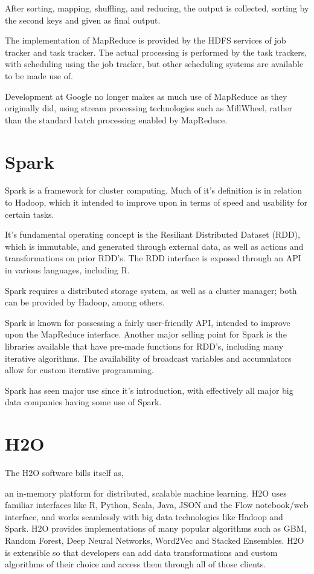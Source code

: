 \documentclass[10pt,a4paper]{article}
\begin{document}
After sorting, mapping, shuffling, and reducing, the output is
collected, sorting by the second keys and given as final output.

The implementation of MapReduce is provided by the HDFS services of
job tracker and task tracker. The actual processing is performed by
the task trackers, with scheduling using the job tracker, but other
scheduling systems are available to be made use of.

Development at Google no longer makes as much use of MapReduce as they
originally did, using stream processing technologies such as
MillWheel, rather than the standard batch processing enabled by
MapReduce.

\section{Spark}
\label{sec:spark}
\nocite{zaharia2010spark}
\nocite{zaharia2016apache}
Spark is a framework for cluster computing. Much of it's definition is
in relation to Hadoop, which it intended to improve upon in terms of
speed and usability for certain tasks.

It's fundamental operating concept is the Resiliant Distributed
Dataset (RDD), which is immutable, and generated through external
data, as well as actions and transformations on prior RDD's. The RDD
interface is exposed through an API in various languages, including R.

Spark requires a distributed storage system, as well as a cluster
manager; both can be provided by Hadoop, among others.

Spark is known for possessing a fairly user-friendly API, intended to
improve upon the MapReduce interface. Another major selling point for
Spark is the libraries available that have pre-made functions for
RDD's, including many iterative algorithms. The availability of
broadcast variables and accumulators allow for custom iterative
programming.

Spark has seen major use since it's introduction, with effectively all
major big data companies having some use of Spark.

\section{H2O}
\label{sec:h2o}
\nocite{h2o.ai:_h2o}
\nocite{h2o.ai:_home_open_sourc_leader_ai}
The H2O software bills itself as,

\begin{displayquote}
  an in-memory platform for distributed, scalable machine learning.
  H2O uses familiar interfaces like R, Python, Scala, Java, JSON and
  the Flow notebook/web interface, and works seamlessly with big data
  technologies like Hadoop and Spark. H2O provides implementations of
  many popular algorithms such as GBM, Random Forest, Deep Neural
  Networks, Word2Vec and Stacked Ensembles. H2O is extensible so that
  developers can add data transformations and custom algorithms of
  their choice and access them through all of those clients.
\end{displayquote}
\end{document}
